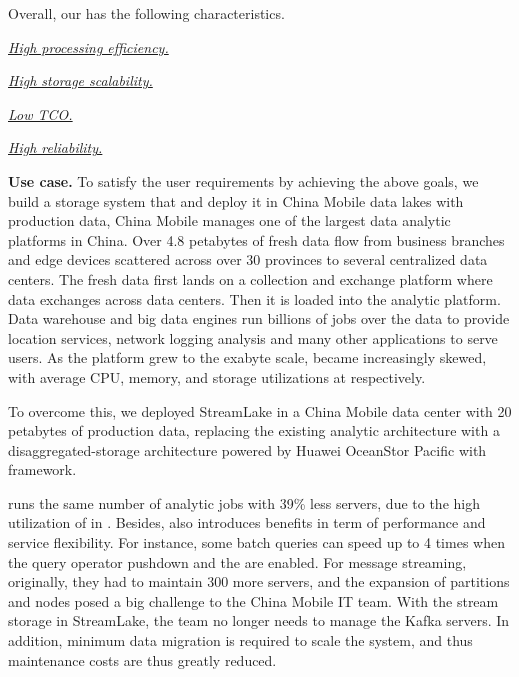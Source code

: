 Overall, our \sys has the following characteristics.


\noindent \underline{\textit{High processing efficiency.}} 


\noindent \underline{\textit{High storage scalability.}}


\noindent \underline{\textit{Low TCO.}} 


\noindent \underline{\textit{High reliability.}}

\noindent \textbf{Use case.} To satisfy the user requirements by achieving the above goals, we build a storage system \sys that  and deploy it in China Mobile data lakes with production data,   China Mobile manages one of the largest data analytic platforms in China.
Over 4.8 petabytes  of fresh data flow from business branches and edge devices scattered across over 30 provinces to several centralized data centers. The fresh data first lands on a collection and exchange platform where data exchanges across data centers. Then it is loaded into the analytic platform. Data warehouse and big data engines run billions of jobs  over the data to provide location services, network logging analysis and many other applications to serve users.
As the platform grew to the exabyte scale,  became increasingly skewed, with average CPU, memory, and storage utilizations at  respectively.




To overcome this, we deployed StreamLake in a China Mobile data center with 20 petabytes of production data, replacing the existing analytic architecture with a disaggregated-storage architecture powered by Huawei OceanStor Pacific with  \sys framework.

\sys runs the same number of analytic jobs with 39\% less servers, due to the high utilization of  in \sys. Besides, \sys also introduces  benefits in term of performance and service flexibility. For instance, some batch queries can speed up to 4 times when the query operator pushdown and the \brain are enabled. 
For message streaming, originally, they had to maintain 300 more \kafka servers, and the expansion of partitions and nodes posed a big challenge to the China Mobile IT team. With the stream storage in StreamLake, the team no longer needs to  manage the Kafka servers. In addition, minimum data migration is required to scale the system, and thus maintenance costs are thus greatly reduced. 


